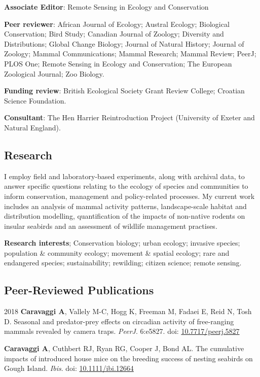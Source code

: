 \documentclass[]{article}
\begin{document}
\textbf{Associate Editor}: Remote Sensing in Ecology and Conservation

\textbf{Peer reviewer}: African Journal of Ecology; Austral Ecology;
Biological Conservation; Bird Study; Canadian Journal of Zoology;
Diversity and Distributions; Global Change Biology; Journal of Natural
History; Journal of Zoology; Mammal Communications; Mammal Research;
Mammal Review; PeerJ; PLOS One; Remote Sensing in Ecology and
Conservation; The European Zoological Journal; Zoo Biology.

\textbf{Funding review}: British Ecological Society Grant Review
College; Croatian Science Foundation.

\textbf{Consultant}: The Hen Harrier Reintroduction Project (University
of Exeter and Natural England).

\subsection{Research}\label{research}

I employ field and laboratory-based experiments, along with archival
data, to answer specific questions relating to the ecology of species
and communities to inform conservation, management and policy-related
processes. My current work includes an analysis of mammal activity
patterns, landscape-scale habitat and distribution modelling,
quantification of the impacts of non-native rodents on insular seabirds
and an assessment of wildlife management practises.

\textbf{Research interests}; Conservation biology; urban ecology;
invasive species; population \& community ecology; movement \& spatial
ecology; rare and endangered species; sustainability; rewilding; citizen
science; remote sensing.

\subsection{Peer-Reviewed
Publications}\label{peer-reviewed-publications}

2018 \textbf{Caravaggi A}, Vallely M-C, Hogg K, Freeman M, Fadaei E,
Reid N, Tosh D. Seasonal and predator-prey effects on circadian activity
of free-ranging mammals revealed by camera traps. \emph{PeerJ}. 6:e5827.
doi: \href{https://doi.org/10.7717/peerj.5827}{10.7717/peerj.5827}

\textbf{Caravaggi A}, Cuthbert RJ, Ryan RG, Cooper J, Bond AL. The
cumulative impacts of introduced house mice on the breeding success of
nesting seabirds on Gough Island. \emph{Ibis}. doi:
\href{https://onlinelibrary.wiley.com/doi/10.1111/ibi.12664}{10.1111/ibi.12664}
\end{document}
